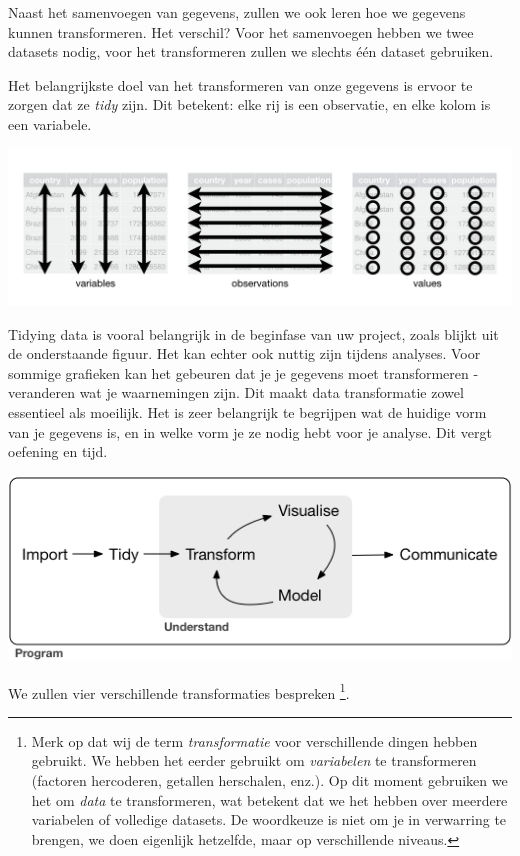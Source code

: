 \documentclass[]{tufte-book}
\begin{document}
Naast het samenvoegen van gegevens, zullen we ook leren hoe we gegevens kunnen transformeren. Het verschil? Voor het samenvoegen hebben we twee datasets nodig, voor het transformeren zullen we slechts één dataset gebruiken.

Het belangrijkste doel van het transformeren van onze gegevens is ervoor te zorgen dat ze \emph{tidy} zijn. Dit betekent: elke rij is een observatie, en elke kolom is een variabele.

\includegraphics[width=1\linewidth]{images/tidydata}

Tidying data is vooral belangrijk in de beginfase van uw project, zoals blijkt uit de onderstaande figuur. Het kan echter ook nuttig zijn tijdens analyses. Voor sommige grafieken kan het gebeuren dat je je gegevens moet transformeren - veranderen wat je waarnemingen zijn. Dit maakt data transformatie zowel essentieel als moeilijk. Het is zeer belangrijk te begrijpen wat de huidige vorm van je gegevens is, en in welke vorm je ze nodig hebt voor je analyse. Dit vergt oefening en tijd.

\includegraphics[width=1\linewidth]{images/tidyverse}

We zullen vier verschillende transformaties bespreken \footnote{Merk op dat wij de term \emph{transformatie} voor verschillende dingen hebben gebruikt. We hebben het eerder gebruikt om \emph{variabelen} te transformeren (factoren hercoderen, getallen herschalen, enz.). Op dit moment gebruiken we het om \emph{data} te transformeren, wat betekent dat we het hebben over meerdere variabelen of volledige datasets. De woordkeuze is niet om je in verwarring te brengen, we doen eigenlijk hetzelfde, maar op verschillende niveaus.}.
\end{document}
